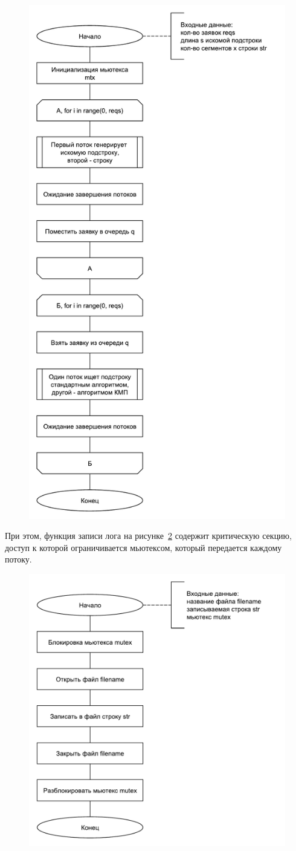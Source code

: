 \begin{figure}
	\centering
	\includegraphics[width=0.7\linewidth]{images/parallel}
	\caption[Параллельная конвейерная обработка]{}
	\label{fig:parallel}
\end{figure}

При этом, функция записи лога на рисунке~\ref{fig:log} содержит критическую секцию, доступ к которой ограничивается мьютексом, который передается каждому потоку.

\begin{figure}
	\centering
	\includegraphics[width=0.7\linewidth]{images/log.pdf}
	\caption[Запись строки в файл]{}
	\label{fig:log}
\end{figure}